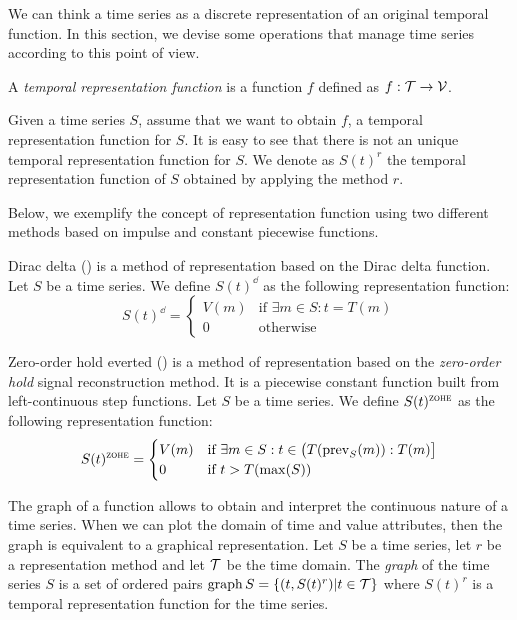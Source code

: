 We can think a time series as a discrete representation of an original
temporal function. In this section, we devise some operations that
manage time series according to this point of view.

A \emph{temporal representation function} is a function $f$ defined as
$f:\mathcal{T}\rightarrow\cal{V}$.

Given a time series $S$, assume that we want to obtain $f$, a temporal
representation function for $S$. It is easy to see that there is not
an unique temporal representation function for $S$. We denote as
$S(t)^r$ the temporal representation function of $S$ obtained by
applying the method $r$.

Below, we exemplify the concept of representation function using two
different methods based on impulse and constant piecewise functions.

\begin{definition} 
  Dirac delta (\dd) is a method of representation based on the Dirac
  delta function. Let $S$ be a time series. We define $S(t)^\dd$ as
  the following \dd{} representation function:
  \[
  S(t)^\dd
  =  \begin{cases}
          V(m) & \text{if } \exists m\in S:t=T(m) \\
          0    & \text{otherwise}
  \end{cases}
  \]
\end{definition}

\begin{definition}
  Zero-order hold everted (\zohe{}) is a method of representation
  based on the \emph{zero-order hold} signal reconstruction method. It
  is a piecewise constant function built from left-continuous step
  functions.  Let $S$ be a time series. We define $S(t)^\zohe$ as the
  following representation function:
  \[
  S(t)^\zohe 
  = \begin{cases}
    V(m) & \text{if } \exists m\in S: t\in \big(T(\prev_S(m)):T(m)\big]\\
    0    & \text{if } t > T(\max(S)) 
  \end{cases}
  \]
\end{definition}

The graph of a function allows to obtain and interpret the continuous
nature of a time series. When we can plot the domain of time and value
attributes, then the graph is equivalent to a graphical
representation.
%
Let $S$ be a time series, let $r$ be a representation method and let
$\cal{T}$ be the time domain. The \emph{graph} of the time series $S$
is a set of ordered pairs $\operatorname*{graph} S =\{(t,S(t)^r)|t\in \cal{T}\}$
where $S(t)^r$ is a temporal representation function for the time
series.


